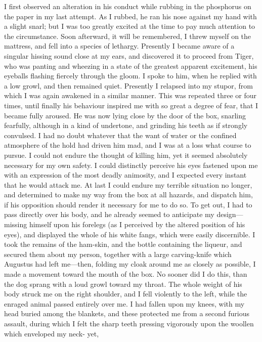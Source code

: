 I first observed an alteration in his conduct while rubbing in the phosphorus
on the paper in my last attempt. As I rubbed, he ran his nose against my hand
with a slight snarl; but I was too greatly excited at the time to pay much
attention to the circumstance. Soon afterward, it will be remembered, I threw
myself on the mattress, and fell into a species of lethargy. Presently I became
aware of a singular hissing sound close at my ears, and discovered it to proceed
from Tiger, who was panting and wheezing in a state of the greatest apparent
excitement, his eyeballs flashing fiercely through the gloom. I spoke to him,
when he replied with a low growl, and then remained quiet. Presently I relapsed
into my stupor, from which I was again awakened in a similar manner. This was
repeated three or four times, until finally his behaviour inspired me with so
great a degree of fear, that I became fully aroused. He was now lying close by
the door of the box, snarling fearfully, although in a kind of undertone, and
grinding his teeth as if strongly convulsed. I had no doubt whatever that the
want of water or the confined atmosphere of the hold had driven him mad, and I
was at a loss what course to pursue. I could not endure the thought of killing
him, yet it seemed absolutely necessary for my own safety. I could distinctly
perceive his eyes fastened upon me with an expression of the most deadly
animosity, and I expected every instant that he would attack me. At last I could
endure my terrible situation no longer, and determined to make my way from the
box at all hazards, and dispatch him, if his opposition should render it
necessary for me to do so. To get out, I had to pass directly over his body, and
he already seemed to anticipate my design---missing himself upon his forelegs
(as I perceived by the altered position of his eyes), and displayed the whole of
his white fangs, which were easily discernible. I took the remains of the
ham-skin, and the bottle containing the liqueur, and secured them about my
person, together with a large carving-knife which Augustus had left me---then,
folding my cloak around me as closely as possible, I made a movement toward the
mouth of the box. No sooner did I do this, than the dog sprang with a loud growl
toward my throat. The whole weight of his body struck me on the right shoulder,
and I fell violently to the left, while the enraged animal passed entirely over
me. I had fallen upon my knees, with my head buried among the blankets, and
these protected me from a second furious assault, during which I felt the sharp
teeth pressing vigorously upon the woollen which enveloped my neck- yet,
